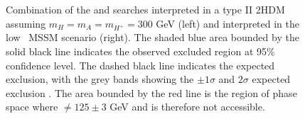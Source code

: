 \begin{figure}[h!]
\begin{center}
\caption{Combination of the \AtoZhtolltautau and \Htohhtobbtautau searches
interpreted in a type II 2HDM assuming $m_{H} = m_{A} = m_{H^{+}} = 300$ GeV (left) and interpreted
in the low \tanb ~MSSM scenario (right). The shaded blue area bounded by
the solid black line indicates the observed excluded region at 95\% confidence level.
The dashed black line indicates the expected exclusion, with the grey bands showing
the $\pm 1\sigma$ and $2\sigma$ expected exclusion \cite{CMS-HIG-14-034}. The area
bounded by the red line is the region of phase space where \mh $\neq 125 \pm 3$ 
GeV and is therefore not accessible.}
\label{fig:HhhAZhMSSM2HDM}
\end{center}
\end{figure}
